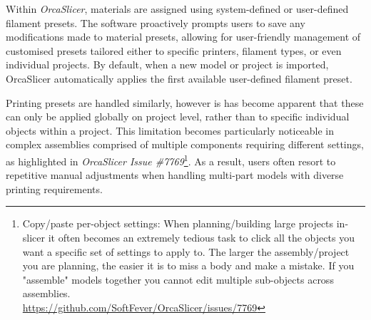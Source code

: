 Within \textit{OrcaSlicer}, materials are assigned using system-defined or user-defined filament presets.
The software proactively prompts users to save any modifications made to material presets, allowing for user-friendly management of customised presets tailored either to specific printers, filament types, or even individual projects.
By default, when a new model or project is imported, OrcaSlicer automatically applies the first available user-defined filament preset.

Printing presets are handled similarly, however is has become apparent that these can only be applied globally on project level, rather than to specific individual objects within a project. 
This limitation becomes particularly noticeable in complex assemblies comprised of multiple components requiring different settings,
as highlighted in \textit{OrcaSlicer Issue \#7769}\footnote{Copy/paste per-object settings: When planning/building large projects in-slicer it often becomes an extremely tedious task to click all the objects you want a specific set of settings to apply to. The larger the assembly/project you are planning, the easier it is to miss a body and make a mistake. If you "assemble" models together you cannot edit multiple sub-objects across assemblies.\\ \url{https://github.com/SoftFever/OrcaSlicer/issues/7769}}.
As a result, users often resort to repetitive manual adjustments when handling multi-part models with diverse printing requirements.




